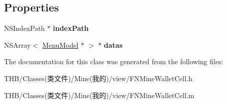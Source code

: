 \subsection*{Properties}
\begin{DoxyCompactItemize}
\item 
\mbox{\label{interface_f_n_mine_wallet_cell_aabdb6473ec49729255408cabc9f84062}} 
N\+S\+Index\+Path $\ast$ {\bfseries index\+Path}
\item 
\mbox{\label{interface_f_n_mine_wallet_cell_a48f5e382ed9563c4639670d8015cfff8}} 
N\+S\+Array$<$ \mbox{\hyperlink{interface_menu_model}{Menu\+Model}} $\ast$ $>$ $\ast$ {\bfseries datas}
\end{DoxyCompactItemize}


The documentation for this class was generated from the following files\+:\begin{DoxyCompactItemize}
\item 
T\+H\+B/\+Classes(类文件)/\+Mine(我的)/view/F\+N\+Mine\+Wallet\+Cell.\+h\item 
T\+H\+B/\+Classes(类文件)/\+Mine(我的)/view/F\+N\+Mine\+Wallet\+Cell.\+m\end{DoxyCompactItemize}
